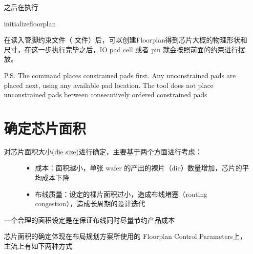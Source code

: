\documentclass[letterpaper,10pt,english]{sphinxmanual}
\begin{document}
\sphinxAtStartPar
之后在执行

\begin{sphinxVerbatim}[commandchars=\\\{\},numbers=left,firstnumber=1,stepnumber=1]
initialize\PYGZus{}floorplan
\end{sphinxVerbatim}

\sphinxAtStartPar
在读入管脚约束文件（  文件）后，可以创建Floorplan得到芯片大概的物理形状和尺寸，在这一步执行完毕之后，IO pad cell 或者 pin 就会按照前面的约束进行摆放。

\sphinxAtStartPar
P.S. The  command places constrained pads first. Any unconstrained pads are placed next, using any available pad location. The tool does not place unconstrained pads between consecutively ordered constrained pads

\begin{figure}[htbp]
\centering

\noindent{}
\end{figure}


\section{确定芯片面积}
\label{\detokenize{chapter5/_u786e_u5b9a_u82af_u7247_u9762_u79ef:id1}}\label{\detokenize{chapter5/_u786e_u5b9a_u82af_u7247_u9762_u79ef::doc}}\begin{description}
\item[{对芯片面积大小(die size)进行确定，主要基于两个方面进行考虑：}] \leavevmode\begin{itemize}
\item {} 
\sphinxAtStartPar
成本：面积越小，单张 wafer 的产出的裸片（die）数量增加，芯片的平均成本下降

\item {} 
\sphinxAtStartPar
布线质量：设定的裸片面积过小，造成布线堵塞（routing congestion），造成长周期的设计迭代

\end{itemize}

\end{description}

\sphinxAtStartPar
一个合理的面积设定是在保证布线同时尽量节约产品成本

\sphinxAtStartPar
芯片面积的确定体现在布局规划方案所使用的 Floorplan Control Parameters上，主流上有如下两种方式
\end{document}
